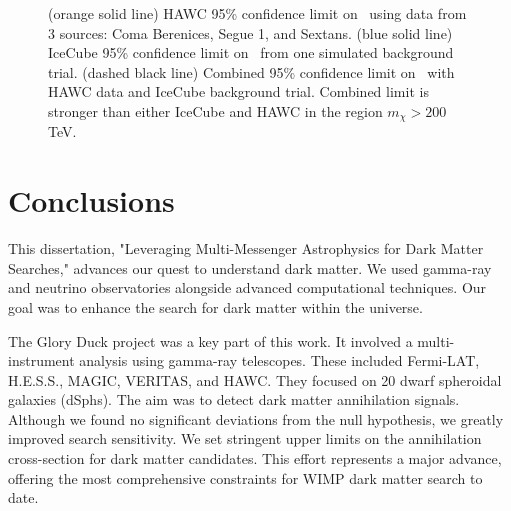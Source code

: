 \begin{figure}
    \caption{(orange solid line) HAWC 95\% confidence limit on \sv~using data from 3 sources: Coma Berenices, Segue 1, and Sextans. (blue solid line) IceCube 95\% confidence limit on \sv~from one simulated background trial. (dashed black line) Combined 95\% confidence limit on \sv~with HAWC data and IceCube background trial. Combined limit is stronger than either IceCube and HAWC in the region $m_\chi > 200$ TeV. }
    \label{fig:nuDuck_mockdata}
\end{figure}

\section{Conclusions}\label{sec:conclusions}

This dissertation, "Leveraging Multi-Messenger Astrophysics for Dark Matter Searches," advances our quest to understand dark matter. We used gamma-ray and neutrino observatories alongside advanced computational techniques. Our goal was to enhance the search for dark matter within the universe.

The Glory Duck project was a key part of this work. It involved a multi-instrument analysis using gamma-ray telescopes. These included Fermi-LAT, H.E.S.S., MAGIC, VERITAS, and HAWC. They focused on 20 dwarf spheroidal galaxies (dSphs). The aim was to detect dark matter annihilation signals. Although we found no significant deviations from the null hypothesis, we greatly improved search sensitivity. We set stringent upper limits on the annihilation cross-section for dark matter candidates. This effort represents a major advance, offering the most comprehensive constraints for WIMP dark matter search to date.

